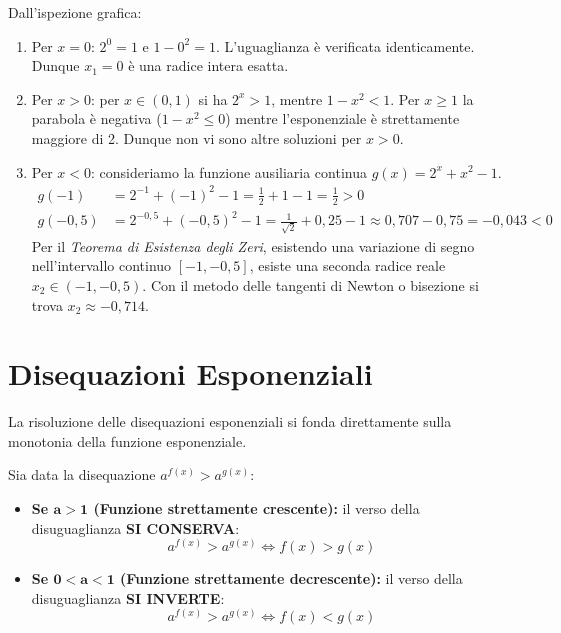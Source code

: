 \documentclass[11pt,a4paper,oneside]{report}
\begin{document}
\begin{esercizio}[Risoluzione grafica di $2^x = 1 - x^2$]
Dall'ispezione grafica:
\begin{enumerate}
    \item Per $x = 0$: $2^0 = 1$ e $1 - 0^2 = 1$. L'uguaglianza è verificata identicamente. Dunque \textbf{$x_1 = 0$} è una radice intera esatta.
    \item Per $x > 0$: per $x \in (0, 1)$ si ha $2^x > 1$, mentre $1 - x^2 < 1$. Per $x \ge 1$ la parabola è negativa ($1 - x^2 \le 0$) mentre l'esponenziale è strettamente maggiore di 2. Dunque non vi sono altre soluzioni per $x > 0$.
    \item Per $x < 0$: consideriamo la funzione ausiliaria continua $g(x) = 2^x + x^2 - 1$.
    \begin{align*}
        g(-1) &= 2^{-1} + (-1)^2 - 1 = \frac{1}{2} + 1 - 1 = \frac{1}{2} > 0 \\
        g(-0{,}5) &= 2^{-0{,}5} + (-0{,}5)^2 - 1 = \frac{1}{\sqrt{2}} + 0{,}25 - 1 \approx 0{,}707 - 0{,}75 = -0{,}043 < 0
    \end{align*}
    Per il \emph{Teorema di Esistenza degli Zeri}, esistendo una variazione di segno nell'intervallo continuo $[-1, -0{,}5]$, esiste una seconda radice reale $x_2 \in (-1, -0{,}5)$. Con il metodo delle tangenti di Newton o bisezione si trova $x_2 \approx -0{,}714$.
\end{enumerate}
\end{esercizio}

\section{Disequazioni Esponenziali}
La risoluzione delle disequazioni esponenziali si fonda direttamente sulla monotonia della funzione esponenziale.

\begin{metodo}
Sia data la disequazione $a^{f(x)} > a^{g(x)}$:
\begin{itemize}
    \item \textbf{Se $\mathbf{a > 1}$ (Funzione strettamente crescente):} il verso della disuguaglianza \textbf{SI CONSERVA}:
    \begin{equation}
        a^{f(x)} > a^{g(x)} \iff f(x) > g(x)
    \end{equation}
    \item \textbf{Se $\mathbf{0 < a < 1}$ (Funzione strettamente decrescente):} il verso della disuguaglianza \textbf{SI INVERTE}:
    \begin{equation}
        a^{f(x)} > a^{g(x)} \iff f(x) < g(x)
    \end{equation}
\end{itemize}
\end{metodo}
\end{document}
